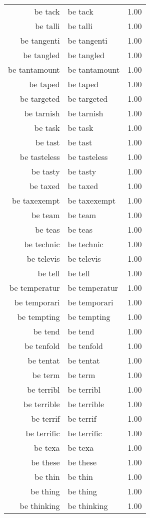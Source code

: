 \begin{table}[ht]
\begin{tabular}{rlr}
  be tack & be tack & 1.00 \\ 
  be talli & be talli & 1.00 \\ 
  be tangenti & be tangenti & 1.00 \\ 
  be tangled & be tangled & 1.00 \\ 
  be tantamount & be tantamount & 1.00 \\ 
  be taped & be taped & 1.00 \\ 
  be targeted & be targeted & 1.00 \\ 
  be tarnish & be tarnish & 1.00 \\ 
  be task & be task & 1.00 \\ 
  be tast & be tast & 1.00 \\ 
  be tasteless & be tasteless & 1.00 \\ 
  be tasty & be tasty & 1.00 \\ 
  be taxed & be taxed & 1.00 \\ 
  be taxexempt & be taxexempt & 1.00 \\ 
  be team & be team & 1.00 \\ 
  be teas & be teas & 1.00 \\ 
  be technic & be technic & 1.00 \\ 
  be televis & be televis & 1.00 \\ 
  be tell & be tell & 1.00 \\ 
  be temperatur & be temperatur & 1.00 \\ 
  be temporari & be temporari & 1.00 \\ 
  be tempting & be tempting & 1.00 \\ 
  be tend & be tend & 1.00 \\ 
  be tenfold & be tenfold & 1.00 \\ 
  be tentat & be tentat & 1.00 \\ 
  be term & be term & 1.00 \\ 
  be terribl & be terribl & 1.00 \\ 
  be terrible & be terrible & 1.00 \\ 
  be terrif & be terrif & 1.00 \\ 
  be terrific & be terrific & 1.00 \\ 
  be texa & be texa & 1.00 \\ 
  be these & be these & 1.00 \\ 
  be thin & be thin & 1.00 \\ 
  be thing & be thing & 1.00 \\ 
  be thinking & be thinking & 1.00 \\ 

\end{tabular}
\end{table}
